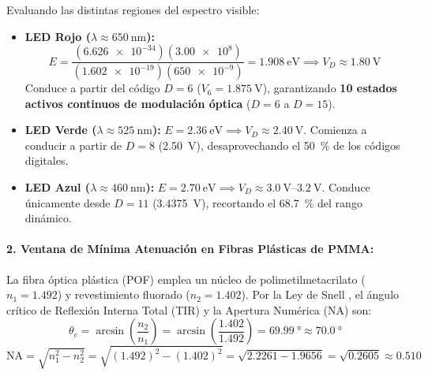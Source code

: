 \documentclass[11pt,letterpaper]{article}
\begin{document}
Evaluando las distintas regiones del espectro visible:
\begin{itemize}
    \item \textbf{LED Rojo ($\lambda \approx \SI{650}{\nano\meter}$):}
    \begin{equation}
    E = \frac{(\num{6.626e-34})(\num{3.00e8})}{(\num{1.602e-19})(\num{650e-9})} = \SI{1.908}{\electronvolt} \implies V_D \approx \SI{1.80}{\volt}
    \end{equation}
    Conduce a partir del código $D=6$ ($V_6 = \SI{1.875}{\volt}$), garantizando \textbf{10 estados activos continuos de modulación óptica} ($D=6$ a $D=15$).
    \item \textbf{LED Verde ($\lambda \approx \SI{525}{\nano\meter}$):} $E = \SI{2.36}{\electronvolt} \implies V_D \approx \SI{2.40}{\volt}$. Comienza a conducir a partir de $D=8$ (\SI{2.50}{\volt}), desaprovechando el \SI{50}{\percent} de los códigos digitales.
    \item \textbf{LED Azul ($\lambda \approx \SI{460}{\nano\meter}$):} $E = \SI{2.70}{\electronvolt} \implies V_D \approx \SI{3.0}{\volt}\text{--}\SI{3.2}{\volt}$. Conduce únicamente desde $D=11$ (\SI{3.4375}{\volt}), recortando el \SI{68.7}{\percent} del rango dinámico.
\end{itemize}

\paragraph{2. Ventana de Mínima Atenuación en Fibras Plásticas de PMMA:}
La fibra óptica plástica (POF) emplea un núcleo de polimetilmetacrilato ($n_1 = 1.492$) y revestimiento fluorado ($n_2 = 1.402$). Por la Ley de Snell \cite{tipler2010,ziemann2008}, el ángulo crítico de Reflexión Interna Total (TIR) y la Apertura Numérica (NA) son:
\begin{equation}
\theta_c = \arcsin\left( \frac{n_2}{n_1} \right) = \arcsin\left( \frac{1.402}{1.492} \right) = \SI{69.99}{\degree} \approx \SI{70.0}{\degree}
\label{eq:angulo_critico}
\end{equation}
\begin{equation}
\mathrm{NA} = \sqrt{n_1^2 - n_2^2} = \sqrt{(1.492)^2 - (1.402)^2} = \sqrt{2.2261 - 1.9656} = \sqrt{0.2605} \approx \mathbf{0.510}
\label{eq:apertura_numerica}
\end{equation}
\end{document}
